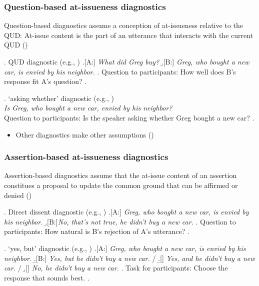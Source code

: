 \documentclass[compress, xcolor = dvipsnames, aspectratio=169]{beamer}
\begin{document}
	\begin{frame}[t]\frametitle{Question-based at-issueness diagnostics}\small

		Question-based diagnostics assume a conception of at-issueness relative to the QUD: At-issue content is the part of an utterance that interacts with the current QUD (\citealt{amaral_review_2007,simons_what_2010})\pause

		\ex. \label{qud}%
		    QUD diagnostic (e.g., \citealt{tonhauser_diagnosing_2012,chen_presuppositions_2024})
		    \a.[A:] \emph{What did Greg buy?}
		    \b.[B:] \emph{Greg, who bought a new car, is envied by his neighbor.}
		    \z.
		    Question to participants: How well does B's response fit A's question?\pause
		\z.	

		\ex. \label{aw}%
		    `asking whether' diagnostic (e.g., \citealt{tonhauser_how_2018,solstad_cataphoric_2024})\smallskip\\
		      \emph{Is Greg, who bought a new car, envied by his neighbor?}\smallskip
		  \\ Question to participants: Is the speaker asking whether Greg bought a new car?\pause
		  \z.

		\begin{itemize}
			\item Other diagnostics make other assumptions
			(\citealt{snider_anaphoric_2017,snider_at-issuenessne_2017,snider_distinguishing_2018,koev_notions_2018,faller_discourse_2019,korotkova_evidential_2020})
		\end{itemize}
	
	\end{frame}

	\begin{frame}[t]\frametitle{Assertion-based at-issueness diagnostics}\small
		Assertion-based diagnostics assume that the at-issue content of an assertion constitues a proposal to update the common ground that can be affirmed or denied (\citealt{farkas_reacting_2010,murray_varieties_2014,anderbois_at-issue_2015})\pause

		  \ex. \label{dd} Direct dissent diagnostic (e.g., \citealt{tonhauser_diagnosing_2012,syrett_experimental_2015})
		    \a.[A:] \emph{Greg, who bought a new car, is envied by his neighbor.}
		    \b.[B:]\emph{No, that's not true, he didn't buy a new car.}
		    \z.
		  Question to participants: How natural is B's rejection of A's utterance?\pause
		  \z.

		  \ex. \label{yesbut}%
		    `yes, but' diagnostic (e.g., \citealt{xue_correlation_2011,destruel_cross-linguistic_2015})
		    \a.[A:] \emph{Greg, who bought a new car, is envied by his neighbor.}
		    \b.[B:] \emph{Yes, but he didn't buy a new car.} /
		    \b.[] \emph{Yes, and he didn't buy a new car.} /
		    \b.[] \emph{No, he didn't buy a new car.}
		    \z.
		    Task for participants: Choose the response that sounds best.
		  \z.
	
	\end{frame}
\end{document}
